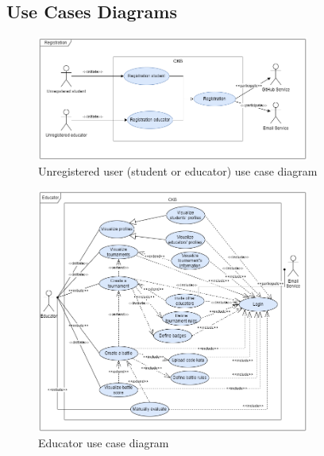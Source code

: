 \subsection{Use Cases Diagrams}
\begin{figure}[H]
    \centering
    \includegraphics[width=0.8\textwidth]{images/use_cases_diagrams/Registration.png}
    \caption{Unregistered user (student or educator) use case diagram}
    \label{fig:use_case_diagram}
\end{figure}

\begin{figure}[H]
    \centering
    \includegraphics[width=0.8\textwidth]{images/use_cases_diagrams/educators_functions.png}
    \caption{Educator use case diagram}
    \label{fig:use_case_diagram}
\end{figure}

